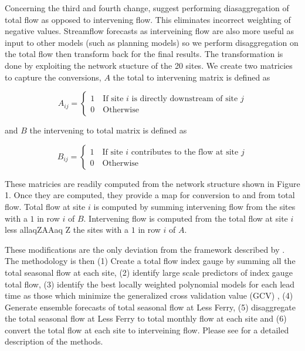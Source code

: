 \documentclass[11pt]{article}
\begin{document}
Concerning the third and fourth change, \cite{Nowak:2010p2738} suggest performing diasaggregation of total flow as opposed to intervening flow.  This eliminates incorrect weighting of negative values.  Streamflow forecasts as interveining flow are also more useful as input to other models (such as planning models) so we perform disaggregation on the total flow then transform back for the final results.  The transformation is done by exploiting the network stucture of the 20 sites.  We create two matricies to capture the conversions, $A$ the total to intervening matrix is defined as 

$$A_{ij} = 
\left\{
\begin{array}{l}
1 \quad\mbox{If site $i$ is directly downstream of site $j$} \\ 
0 \quad\mbox{Otherwise}
\end{array}\right.
$$

and $B$ the intervening to total matrix is defined as

$$B_{ij} = 
\left\{
\begin{array}{l}
1 \quad\mbox{If site $i$ contributes to the flow at site $j$} \\ 
0 \quad\mbox{Otherwise}
\end{array}\right.
$$

These matricies are readily computed from the network structure shown in Figure 1. Once they are computed, they provide a map for conversion to and from total flow.  Total flow at site $i$ is computed by summing intervening flow from the sites with a $1$ in row $i$ of $B$.  Intervening flow is computed from the total flow at site $i$ less allaqZAAaq	Z the sites with a $1$ in row $i$ of $A$. 

These modifications are the only deviation from the framework described by \cite{Bracken:2010p2682}. The methodology is then (1) Create a total flow index gauge by summing all the total seasonal flow at each site, (2) identify large scale predictors of index gauge total flow, (3) identify the best \citep{Hagedorn2005,Krishnamurti2000,Rajagopalan2002,Regonda2006} locally weighted polynomial \cite{Loader1999} models for each lead time as those which minimize the generalized cross validation value (GCV) \citep{Craven1979}, (4) Generate ensemble forecasts  \cite{Regonda2006} of total seasonal flow at Less Ferry, (5) disaggregate the total seasonal flow at Less Ferry to total monthly flow at each site and (6) convert the total flow at each site to interveining flow.  Please see \cite{Bracken:2010p2682} for a detailed description of the methods. 
\end{document}
